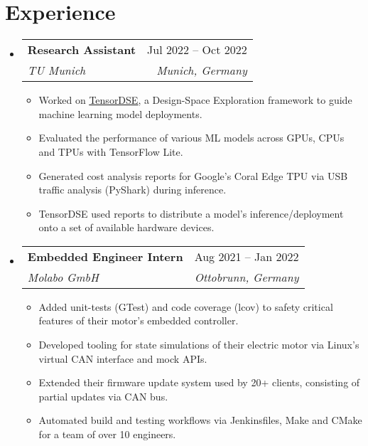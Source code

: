 \documentclass[letterpaper,11pt]{article}
\makeatletter
\newcommand{\resumeItem}[1]{
  \item\small{
    {#1 \vspace{-2pt}}
  }
}
\newcommand{\resumeSubheading}[4]{
  \vspace{-2pt}\item
    \begin{tabular*}{0.97\textwidth}[t]{l@{\extracolsep{\fill}}r}
      \textbf{#1} & #2 \\
      \textit{\small#3} & \textit{\small #4} \\
    \end{tabular*}\vspace{-7pt}
}
\newcommand{\resumeSubHeadingListStart}{\begin{itemize}[leftmargin=0.15in, label={}]}
\newcommand{\resumeSubHeadingListEnd}{\end{itemize}}
\newcommand{\resumeItemListStart}{\begin{itemize}}
\newcommand{\resumeItemListEnd}{\end{itemize}\vspace{-5pt}}
\makeatother
\begin{document}
\vspace{-14.0pt}

\section{Experience}
    \resumeSubHeadingListStart
        \resumeSubheading
            {Research Assistant}{Jul 2022 -- Oct 2022}
            {TU Munich}{Munich, Germany}
            \resumeItemListStart
                \resumeItem{Worked on \href{https://github.com/alxhoff/TensorDSE}{\underline{TensorDSE}}, a Design-Space Exploration framework to guide machine learning model deployments.}
                \resumeItem{Evaluated the performance of various ML models across GPUs, CPUs and TPUs with TensorFlow Lite.}
                \resumeItem{Generated cost analysis reports for Google's Coral Edge TPU via USB traffic analysis (PyShark) during inference.}
                \resumeItem{TensorDSE used reports to distribute a model's inference/deployment onto a set of available hardware devices.}
            \resumeItemListEnd
            \vspace{2.0pt}

        \resumeSubheading
            {Embedded Engineer Intern}{Aug 2021 -- Jan 2022}
            {Molabo GmbH}{Ottobrunn, Germany}
            \resumeItemListStart
                \resumeItem{Added unit-tests (GTest) and code coverage (lcov) to safety critical features of their motor's embedded controller.}
                \resumeItem{Developed tooling for state simulations of their electric motor via Linux's virtual CAN interface and mock APIs.}
                \resumeItem{Extended their firmware update system used by 20+ clients, consisting of partial updates via CAN bus.}
                \resumeItem{Automated build and testing workflows via Jenkinsfiles, Make and CMake for a team of over 10 engineers.}
            \resumeItemListEnd

    \resumeSubHeadingListEnd 

\vspace{-8.0pt}
\end{document}
